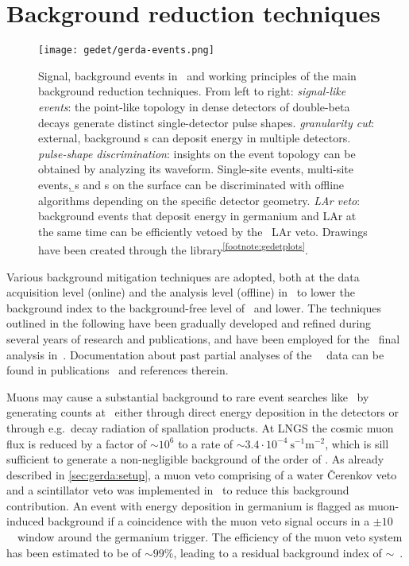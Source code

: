 \section{Background reduction techniques}%
\label{sec:gerda:cuts}

\begin{figure}
  \centering
  \texttt{[image: gedet/gerda-events.png]}
  \caption{%
    Signal, background events in \gerda\ and working principles of the main background
    reduction techniques. From left to right: \emph{signal-like events}: the point-like
    topology in dense detectors of double-beta decays generate distinct single-detector
    pulse shapes. \emph{granularity cut}: external, background \g{}s can deposit energy
    in multiple detectors. \emph{pulse-shape discrimination}: insights on the event
    topology can be obtained by analyzing its waveform. Single-site events, multi-site
    events, \b{}s and \a{}s on the surface can be discriminated with offline algorithms
    depending on the specific detector geometry. \emph{LAr veto}: background events that
    deposit energy in germanium and LAr at the same time can be efficiently vetoed by
    the \gerda\ LAr veto. Drawings have been
    created through the  library\textsuperscript{\ref{footnote:gedetplots}}.
  }\label{fig:gerda:event-types}
\end{figure}

Various background mitigation techniques are adopted, both at the data acquisition level
(online) and the analysis level (offline) in \gerda\ to lower the background index to the
background-free level of \pIIbi\ and lower. The techniques outlined in the following have
been gradually developed and refined during several years of research and publications,
and have been employed for the \phasetwo\ final analysis in~\cite{Kermaidic2020,
Agostini2021}.  Documentation about past partial analyses of the \gerda\ \phasetwo\ data
can be found in publications~\cite{Agostini2015a, Agostini2017, Agostini2018,
Agostini2019a} and references therein.

Muons may cause a substantial background to rare event searches like \gerda\ by generating
counts at \qbb\ either through direct energy deposition in the detectors or through
e.g.~decay radiation of spallation products. At LNGS the cosmic muon flux is reduced by a
factor of ${\sim}10^6$ to a rate of ${\sim}3.4 \cdot 10^{−4}~\text{s}^{-1}\text{m}^{-2}$,
which is sill sufficient to generate a non-negligible background of the order of
.  As already described in \cref{sec:gerda:setup}, a muon veto comprising of
a water \v{C}erenkov veto and a scintillator veto was implemented in \gerda\ to reduce
this background contribution. An event with energy deposition in germanium is flagged
as muon-induced background if a coincidence with the muon veto signal occurs in a $\pm
10$~\mus\ window around the germanium trigger. The efficiency of the muon veto system
has been estimated to be of ${\sim}99$\%, leading to a residual background index of
${\sim}$~\cite{Freund2016}.

